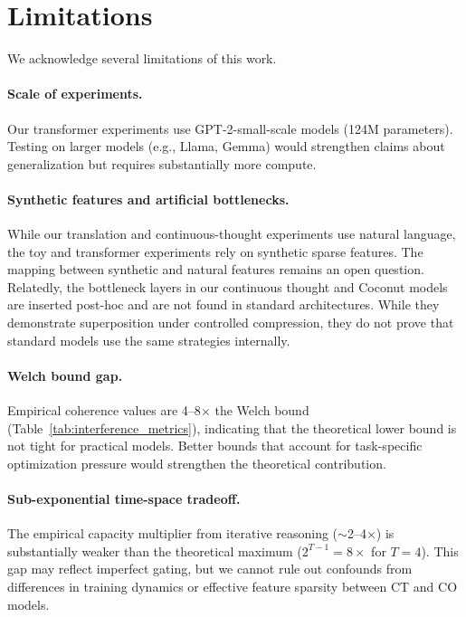 \section{Limitations}

We acknowledge several limitations of this work.

\paragraph{Scale of experiments.} Our transformer experiments use GPT-2-small-scale models (124M parameters). Testing on larger models (e.g., Llama, Gemma) would strengthen claims about generalization but requires substantially more compute.

\paragraph{Synthetic features and artificial bottlenecks.} While our translation and continuous-thought experiments use natural language, the toy and transformer experiments rely on synthetic sparse features. The mapping between synthetic and natural features remains an open question. Relatedly, the bottleneck layers in our continuous thought and Coconut models are inserted post-hoc and are not found in standard architectures. While they demonstrate superposition under controlled compression, they do not prove that standard models use the same strategies internally.

\paragraph{Welch bound gap.} Empirical coherence values are 4--8$\times$ the Welch bound (Table~\ref{tab:interference_metrics}), indicating that the theoretical lower bound is not tight for practical models. Better bounds that account for task-specific optimization pressure would strengthen the theoretical contribution.

\paragraph{Sub-exponential time-space tradeoff.} The empirical capacity multiplier from iterative reasoning ($\sim$2--4$\times$) is substantially weaker than the theoretical maximum ($2^{T-1} = 8\times$ for $T = 4$). This gap may reflect imperfect gating, but we cannot rule out confounds from differences in training dynamics or effective feature sparsity between CT and CO models.

